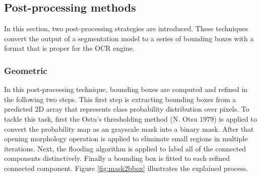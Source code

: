 \documentclass[letterpaper]{article} %
\begin{document}
\subsection{Post-processing methods}

In this section, two post-processing strategies are introduced. These techniques convert the output of a segmentation model to a series of bounding boxes with a format that is proper for the OCR engine.

\subsubsection{Geometric}
In this post-processing technique, bounding boxes are computed and refined in the following two steps.
This first step is extracting bounding boxes from a predicted 2D array that represents class probability distribution over pixels.
To tackle this task, first the Ostu's thresholding method (N. Otsu 1979) is applied to convert the probability map as an grayscale mask into a binary mask.
After that opening morphology operation is applied to eliminate small regions in multiple iterations.
Next, the flooding algorithm is applied to label all of the connected components distinctively. Finally a bounding box is fitted to each refined connected component. Figure \ref{fig:mask2bbox} illustrates the explained process.
\end{document}
